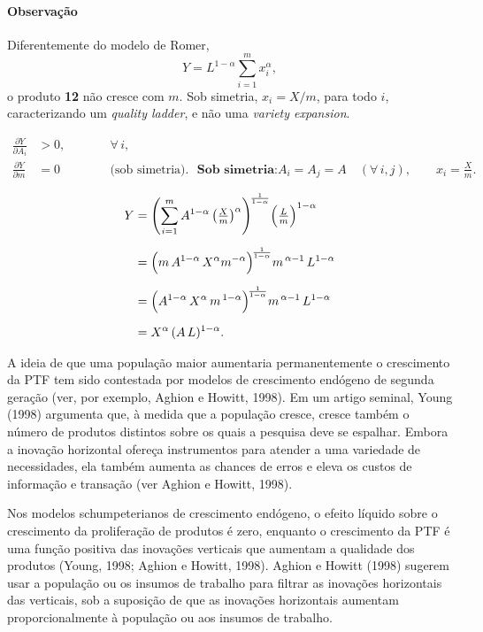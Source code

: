 \documentclass[a4paper,12pt]{article}[abntex2]
\begin{document}
\paragraph{Observação} Diferentemente do modelo de Romer,
\[
Y = L^{1-\alpha}\sum_{i=1}^m x_i^{\alpha},
\]
o produto \textbf{12} não cresce com \(m\). Sob simetria,
\(x_i = X/m\), para todo \(i\), caracterizando um \emph{quality ladder}, e
não uma \emph{variety expansion}.

\begin{align*}
  \frac{\partial Y}{\partial A_i} &> 0, \qquad &&\forall\, i, \\[6pt]
  \frac{\partial Y}{\partial m}   &= 0
  &&\text{(sob simetria).} \ \  \ \textbf{Sob simetria:}
  A_i = A_j = A \quad (\forall\, i,j),
  \qquad
  x_i = \frac{X}{m}.
\end{align*}

\begin{align}
  Y
  &=\Biggl(\sum_{i=1}^{m}
            A^{1-\alpha}\,
            \bigl(\tfrac{X}{m}\bigr)^{\alpha}\Biggr)^{\!\frac{1}{1-\alpha}}
     \Bigl(\tfrac{L}{m}\Bigr)^{1-\alpha} \label{eq:Y_step1}\\[6pt]
  &=\Bigl(m\,A^{1-\alpha}\,X^{\alpha}m^{-\alpha}\Bigr)^{\!\frac{1}{1-\alpha}}
     m^{\,\alpha-1}\,L^{1-\alpha} \label{eq:Y_step2}\\[6pt]
  &=\Bigl(A^{1-\alpha}\,X^{\alpha}\,m^{\,1-\alpha}\Bigr)^{\!\frac{1}{1-\alpha}}
     m^{\,\alpha-1}\,L^{1-\alpha} \label{eq:Y_step3}\\[6pt]
  &=X^{\alpha}\,(A\,L)^{1-\alpha}. \label{eq:Y_final}
\end{align}

A ideia de que uma população maior aumentaria permanentemente o crescimento da PTF tem sido contestada por modelos de crescimento endógeno de segunda geração (ver, por exemplo, Aghion e Howitt, 1998). Em um artigo seminal, Young (1998) argumenta que, à medida que a população cresce, cresce também o número de produtos distintos sobre os quais a pesquisa deve se espalhar. Embora a inovação horizontal ofereça instrumentos para atender a uma variedade de necessidades, ela também aumenta as chances de erros e eleva os custos de informação e transação (ver Aghion e Howitt, 1998).  

Nos modelos schumpeterianos de crescimento endógeno, o efeito líquido sobre o crescimento da proliferação de produtos é zero, enquanto o crescimento da PTF é uma função positiva das inovações verticais que aumentam a qualidade dos produtos (Young, 1998; Aghion e Howitt, 1998). Aghion e Howitt (1998) sugerem usar a população ou os insumos de trabalho para filtrar as inovações horizontais das verticais, sob a suposição de que as inovações horizontais aumentam proporcionalmente à população ou aos insumos de trabalho.
\end{document}
